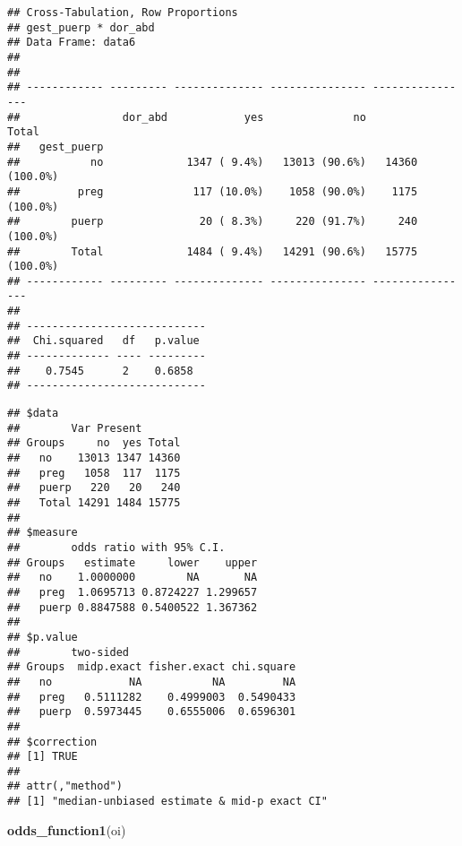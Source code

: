 \documentclass[
]{article}
\newenvironment{Shaded}{\begin{snugshade}}{\end{snugshade}}
\newcommand{\KeywordTok}[1]{\textcolor[rgb]{0.13,0.29,0.53}{\textbf{#1}}}
\newcommand{\NormalTok}[1]{#1}
\newcommand{\OperatorTok}[1]{\textcolor[rgb]{0.81,0.36,0.00}{\textbf{#1}}}
\newcommand{\StringTok}[1]{\textcolor[rgb]{0.31,0.60,0.02}{#1}}
\begin{document}
\begin{verbatim}
## Cross-Tabulation, Row Proportions  
## gest_puerp * dor_abd  
## Data Frame: data6  
## 
## 
## ------------ --------- -------------- --------------- ----------------
##                dor_abd            yes              no            Total
##   gest_puerp                                                          
##           no             1347 ( 9.4%)   13013 (90.6%)   14360 (100.0%)
##         preg              117 (10.0%)    1058 (90.0%)    1175 (100.0%)
##        puerp               20 ( 8.3%)     220 (91.7%)     240 (100.0%)
##        Total             1484 ( 9.4%)   14291 (90.6%)   15775 (100.0%)
## ------------ --------- -------------- --------------- ----------------
## 
## ----------------------------
##  Chi.squared   df   p.value 
## ------------- ---- ---------
##    0.7545      2    0.6858  
## ----------------------------
\end{verbatim}

\begin{Shaded}
\end{Shaded}

\begin{verbatim}
## $data
##        Var Present
## Groups     no  yes Total
##   no    13013 1347 14360
##   preg   1058  117  1175
##   puerp   220   20   240
##   Total 14291 1484 15775
## 
## $measure
##        odds ratio with 95% C.I.
## Groups   estimate     lower    upper
##   no    1.0000000        NA       NA
##   preg  1.0695713 0.8724227 1.299657
##   puerp 0.8847588 0.5400522 1.367362
## 
## $p.value
##        two-sided
## Groups  midp.exact fisher.exact chi.square
##   no            NA           NA         NA
##   preg   0.5111282    0.4999003  0.5490433
##   puerp  0.5973445    0.6555006  0.6596301
## 
## $correction
## [1] TRUE
## 
## attr(,"method")
## [1] "median-unbiased estimate & mid-p exact CI"
\end{verbatim}

\begin{Shaded}
\begin{Highlighting}[]
\KeywordTok{odds_function1}\NormalTok{(oi)}
\end{Highlighting}
\end{Shaded}
\end{document}
